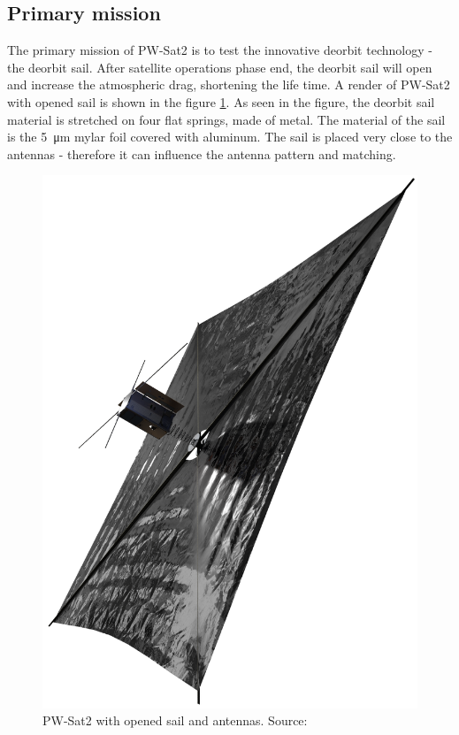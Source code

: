 \subsection{Primary mission}
The primary mission of PW-Sat2 is to test the innovative deorbit technology - the deorbit sail. After satellite operations phase end, the deorbit sail will open and increase the atmospheric drag, shortening the life time. A render of PW-Sat2 with opened sail is shown in the figure \ref{PW-Sat_render_sail}. As seen in the figure, the deorbit sail material is stretched on four flat springs, made of metal. The material of the sail is the \SI{5}{\micro\meter} mylar foil covered with aluminum. The sail is placed very close to the antennas - therefore it can influence the antenna pattern and matching. 
\begin{figure}
    \centering
    \includegraphics[width=0.38\paperwidth]{img/1/PW-Sat2_render_02.png}
    \caption{PW-Sat2 with opened sail and antennas. Source: \cite{PW_sat2_photo}}
    \label{PW-Sat_render_sail}
\end{figure}


